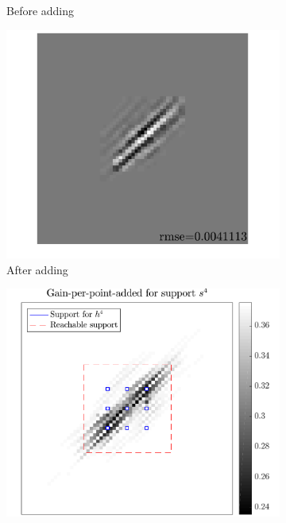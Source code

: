 \begin{figure}[!ht]
\begin{subfigure}[b]{0.32\linewidth}
\caption{Before adding}
\end{subfigure}
\begin{subfigure}[b]{0.32\linewidth}\centering
\includegraphics[width=\linewidth]{figures/before_after/xp_128x128_sc2_angl1_K3_S3_node4after_approx.pdf}
\caption{After adding}
\end{subfigure}
\begin{subfigure}[b]{0.32\linewidth}\centering
\includegraphics[width=\linewidth]{figures/before_after/xp_128x128_sc2_angl1_K3_S3_node4before_objmatrix.pdf}

\end{subfigure}
\end{figure}
